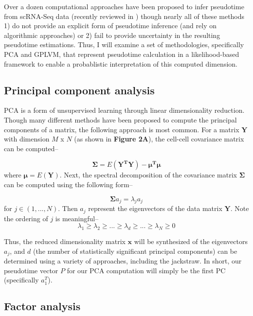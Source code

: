\documentclass[english, 11pt]{article}\usepackage[]{graphicx}\usepackage[]{color}
\begin{document}
Over a dozen computational approaches have been proposed to infer pseudotime from scRNA-Seq data (recently reviewed in \cite{cannoodt2016computational}) though nearly all of these methods 1) do not provide an explicit form of pseudotime inference (and rely on algorithmic approaches) or 2) fail to provide uncertainty in the resulting pseudotime estimations. Thus, I will examine a set of methodologies, specifically PCA and GPLVM, that represent pseudotime calculation in a likelihood-based framework to enable a probablistic interpretation of this computed dimension.


\subsection{Principal component analysis}

PCA is a form of unsupervised learning through linear dimensionality reduction. Though many different methods have been proposed to compute the principal components of a matrix, the following approach is most common. For a matrix $\mathbf{Y}$ with dimension $M$ x $N$  (as shown in \textbf{Figure 2A}), the cell-cell covariance matrix can be computed--

$$ \mathbf{\Sigma} = E(\mathbf{Y^{T}Y}) - \mathbf{\mu^T\mu}$$
where $\mathbf{\mu} = E(\mathbf{Y})$. Next, the spectral decomposition of the covariance matrix $\mathbf{\Sigma}$ can be computed using the following form--

$$\mathbf{\Sigma} a_j = \lambda_j a_j$$
for $j \in (1, ..., N)$. Then $a_j$ represent the eigenvectors of the data matrix $\mathbf{Y}$. Note the ordering of $j$ is meaningful-- 
$$ \lambda_1 \geq \lambda_2 \geq ... \geq \lambda_d \geq ... \geq \lambda_N \geq 0$$


\noindent Thus, the reduced dimensionality matrix $\mathbf{x}$ will be synthesized of the eigenvectors $a_j$, and $d$ (the number of statistically significant principal components) can be determined using a variety of approaches, including the jackstraw. \cite{chung2015statistical} In short, our pseudotime vector $P$ for our PCA computation will simply be the first PC (specifically $a_1^T$). 
 
 
\subsection{Factor analysis}
\end{document}
